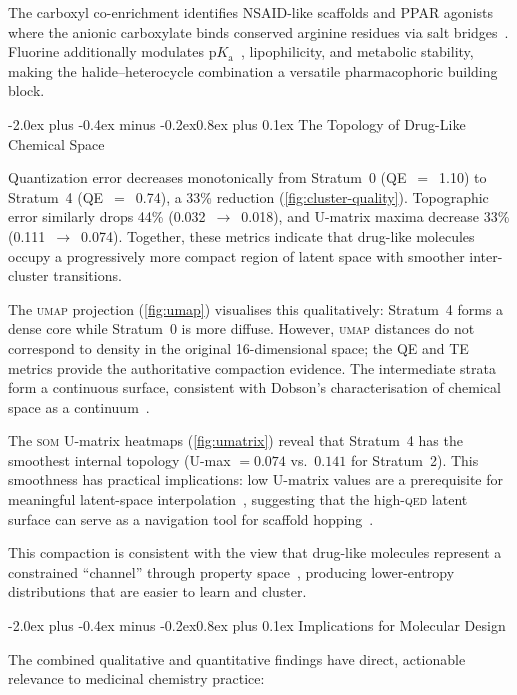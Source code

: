 \documentclass[10pt,a4paper,twocolumn]{article}
\makeatletter
\providecommand{\qed}{}
\let\qed\relax
\newcommand{\som}{\textsc{som}}
\newcommand{\umap}{\textsc{umap}}
\newcommand{\qedscore}{\textsc{qed}}
\let\qed\qedscore
\renewcommand\subsection{\@startsection{subsection}{2}{\z@}%
  {-2.0ex plus -0.4ex minus -0.2ex}{0.8ex plus 0.1ex}%
  {\normalfont\large\bfseries}}
\makeatother
\begin{document}
The carboxyl co-enrichment identifies NSAID-like scaffolds and PPAR agonists where the anionic carboxylate binds conserved arginine residues via salt bridges~\cite{blobaum2007}. Fluorine additionally modulates $\mathrm{p}K_\mathrm{a}$~\cite{morgenthaler2007}, lipophilicity, and metabolic stability, making the halide--heterocycle combination a versatile pharmacophoric building block.

\subsection{The Topology of Drug-Like Chemical Space}

Quantization error decreases monotonically from Stratum~0 (QE~$=$~1.10) to Stratum~4 (QE~$=$~0.74), a 33\% reduction (\cref{fig:cluster-quality}). Topographic error similarly drops 44\% (0.032~$\to$~0.018), and U-matrix maxima decrease 33\% (0.111~$\to$~0.074). Together, these metrics indicate that drug-like molecules occupy a progressively more compact region of latent space with smoother inter-cluster transitions.

The \umap{} projection (\cref{fig:umap}) visualises this qualitatively: Stratum~4 forms a dense core while Stratum~0 is more diffuse. However, \umap{} distances do not correspond to density in the original 16-dimensional space; the QE and TE metrics provide the authoritative compaction evidence. The intermediate strata form a continuous surface, consistent with Dobson's characterisation of chemical space as a continuum~\cite{dobson2004}.

The \som{} U-matrix heatmaps (\cref{fig:umatrix}) reveal that Stratum~4 has the smoothest internal topology (U-max $= 0.074$ vs.\ $0.141$ for Stratum~2). This smoothness has practical implications: low U-matrix values are a prerequisite for meaningful latent-space interpolation~\cite{gomezbombarelli2018}, suggesting that the high-\qed{} latent surface can serve as a navigation tool for scaffold hopping~\cite{hu2017}.

This compaction is consistent with the view that drug-like molecules represent a constrained ``channel'' through property space~\cite{hert2009}, producing lower-entropy distributions that are easier to learn and cluster.

\subsection{Implications for Molecular Design}

The combined qualitative and quantitative findings have direct, actionable relevance to medicinal chemistry practice:
\end{document}
